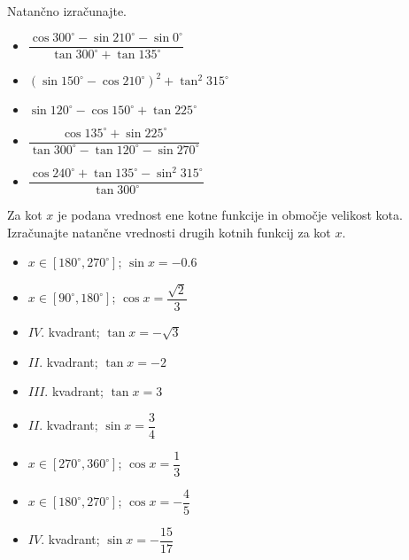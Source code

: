         


        
            \begin{naloga}
                Natančno izračunajte.
                \begin{multicols}{2}
                \begin{itemize}
                            \item $\displaystyle \dfrac{\cos{300^\circ}-\sin{210^\circ}-\sin{0^\circ}}{\tan{300^\circ}+\tan{135^\circ}} $ \\
                            \item $\displaystyle \left(\sin{150^\circ}-\cos{210^\circ}\right)^2+\tan^2{315^\circ} $ \\
                            \item $\displaystyle \sin{120^\circ}-\cos{150^\circ}+\tan{225^\circ} $ \\
                            \item $\displaystyle \dfrac{\cos{135^\circ}+\sin{225^\circ}}{\tan{300^\circ}-\tan{120^\circ}-\sin{270^\circ}} $ \\
                            \item $\displaystyle \dfrac{\cos{240^\circ}+\tan{135^\circ}-\sin^2{315^\circ}}{\tan{300^\circ}} $ 
                \end{itemize}
            \end{multicols}
            \end{naloga}

        

        
        
            \begin{naloga}
                Za kot $x$ je podana vrednost ene kotne funkcije in območje velikost kota.
                Izračunajte natančne vrednosti drugih kotnih funkcij za kot $x$.
                \begin{multicols}{2}
                \begin{itemize}
                            \item $x\in[180^\circ,270^\circ]$; $\sin{x}=-0.6 $ 
                            \item $x\in[90^\circ,180^\circ]$; $\cos{x}=\dfrac{\sqrt{2}}{3}$ 
                            \item $IV.$ kvadrant; $\tan{x}=-\sqrt{3} $ 
                            \item $II.$ kvadrant; $\tan{x}=-2 $ 
                            \item $III.$ kvadrant; $\tan{x}=3 $ 
                            \item $II.$ kvadrant; $\sin{x}=\dfrac{3}{4} $ 
                            \item $x\in[270^\circ,360^\circ]$; $\cos{x}=\dfrac{1}{3}$ 
                            \item $x\in[180^\circ,270^\circ]$; $\cos{x}=-\dfrac{4}{5}$ 
                            \item $IV.$ kvadrant; $\sin{x}=-\dfrac{15}{17} $ 
                \end{itemize}
            \end{multicols}
            \end{naloga}

